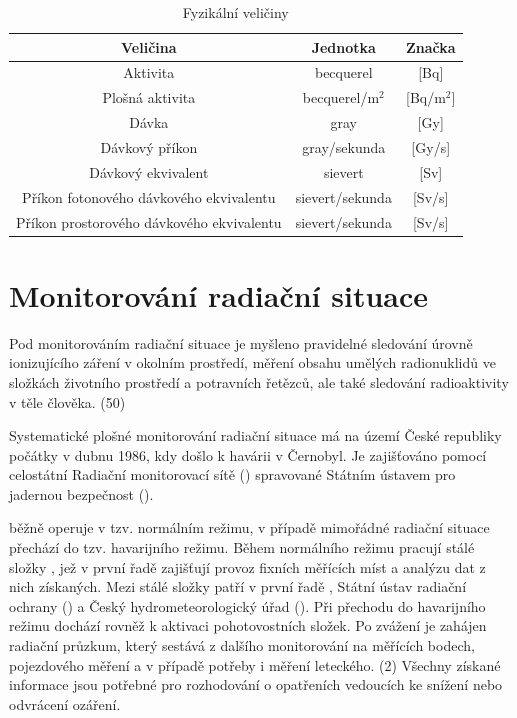\begin{itemize}
		\begin{table}[h!]
			\centering
			\caption{Fyzikální veličiny}
			\label{tab:tab_veliciny}
			\begin{tabular}{|c|c|c|}
				\hline
				\textbf{Veličina}           			& \textbf{Jednotka}  & \textbf{Značka}  \\ \hline
				Aktivita								& becquerel			 & {[}Bq{]}			\\ \hline
				Plošná aktivita							& becquerel/m$^2$	 & {[}Bq/m$^2${]}	\\ \hline
				Dávka                      	 			& gray               & {[}Gy{]}         \\ \hline
				Dávkový příkon              			& gray/sekunda		 & {[}Gy/s{]}       \\ \hline
				Dávkový ekvivalent          			& sievert            & {[}Sv{]}         \\ \hline
				Příkon fotonového dávkového ekvivalentu & sievert/sekunda	 & {[}Sv/s{]}       \\ \hline
				Příkon prostorového dávkového ekvivalentu & sievert/sekunda	 & {[}Sv/s{]}       \\ \hline
			\end{tabular}
		\end{table}
\end{itemize}

\section{Monitorování radiační situace}

Pod monitorováním radiační situace je myšleno pravidelné sledování úrovně ionizujícího záření v okolním prostředí, měření obsahu umělých radionuklidů ve složkách životního prostředí a potravních řetězců, ale také sledování radioaktivity v těle člověka. (50)

Systematické plošné monitorování radiační situace má na území České republiky počátky v dubnu 1986, kdy došlo k havárii v  Černobyl. Je zajišťováno pomocí celostátní Radiační monitorovací sítě () spravované Státním ústavem pro jadernou bezpečnost ().

 běžně operuje v tzv. normálním režimu, v případě mimořádné radiační situace přechází do tzv. havarijního režimu. Během normálního režimu pracují stálé složky , jež v první řadě zajišťují provoz fixních měřících míst a analýzu dat z nich získaných. Mezi stálé složky  patří v první řadě , Státní ústav radiační ochrany () a Český hydrometeorologický úřad (). Při přechodu do havarijního režimu dochází rovněž k aktivaci pohotovostních složek. Po zvážení je zahájen radiační průzkum, který sestává z dalšího monitorování na měřících bodech, pojezdového měření a v případě potřeby i měření leteckého. (2) Všechny získané informace jsou potřebné pro rozhodování o opatřeních vedoucích ke snížení nebo odvrácení ozáření.

